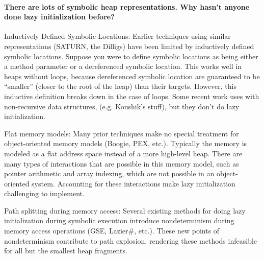 \paragraph{There are lots of symbolic heap representations. Why hasn’t anyone done lazy initialization before?}
\begin{compactitem}
\item[Inductively Defined Symbolic Locations:] 
Earlier techniques using similar representations (SATURN, the Dilligs)
have been limited by inductively defined symbolic locations. Suppose
you were to define symbolic locations as being either a method
parameter or a dereferenced symbolic location. This works well in
heaps without loops, because dereferenced symbolic location are
guaranteed to be “smaller” (closer to the root of the heap) than their
targets. However, this inductive definition breaks down in the case of
loops. Some recent work uses with non-recursive data structures,
(e.g. Koushik’s stuff), but they don’t do lazy initialization.

\item[Flat memory models:] 
Many prior techniques make no special treatment for object-oriented
memory models (Boogie, PEX, etc.). Typically the memory is modeled as
a flat address space instead of a more high-level heap. There are many
types of interactions that are possible in this memory model, such as
pointer arithmetic and array indexing, which are not possible in an
object-oriented system. Accounting for these interactions make lazy
initialization challenging to implement.

\item[Path splitting during memory access:] 
Several existing methods for doing lazy initialization during symbolic
execution introduce nondeterminism during memory access operations
(GSE, Lazier\#, etc.). These new points of nondeterminism contribute
to path explosion, rendering these methods infeasible for all but the
smallest heap fragments.
\end{compactitem}

